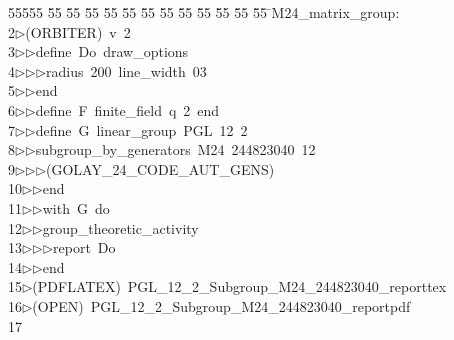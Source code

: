 %
%
\begin{tabbing}
55555 \= 55 \= 55 \= 55 \= 55 \= 55 \= 55 \= 55 \= 55 \= 55 \= 55 \= 55 \= 55 \= \>M24\_matrix\_group:\\[0pt]
2\>$\triangleright$\>(ORBITER)\ v\ 2\ \\[0pt]
3\>$\triangleright$\>$\triangleright$\>define\ Do\ draw\_options\ \\[0pt]
4\>$\triangleright$\>$\triangleright$\>$\triangleright$\>radius\ 200\ line\_width\ 03\ \\[0pt]
5\>$\triangleright$\>$\triangleright$\>end\ \\[0pt]
6\>$\triangleright$\>$\triangleright$\>define\ F\ finite\_field\ q\ 2\ end\ \\[0pt]
7\>$\triangleright$\>$\triangleright$\>define\ G\ linear\_group\ PGL\ 12\ 2\ \\[0pt]
8\>$\triangleright$\>$\triangleright$\>subgroup\_by\_generators\ M24\ 244823040\ 12\ \\[0pt]
9\>$\triangleright$\>$\triangleright$\>$\triangleright$\>(GOLAY\_24\_CODE\_AUT\_GENS)\ \\[0pt]
10\>$\triangleright$\>$\triangleright$\>end\ \\[0pt]
11\>$\triangleright$\>$\triangleright$\>with\ G\ do\ \\[0pt]
12\>$\triangleright$\>$\triangleright$\>group\_theoretic\_activity\ \\[0pt]
13\>$\triangleright$\>$\triangleright$\>$\triangleright$\>report\ Do\ \\[0pt]
14\>$\triangleright$\>$\triangleright$\>end\\[0pt]
15\>$\triangleright$\>(PDFLATEX)\ PGL\_12\_2\_Subgroup\_M24\_244823040\_reporttex\\[0pt]
16\>$\triangleright$\>(OPEN)\ PGL\_12\_2\_Subgroup\_M24\_244823040\_reportpdf\\[0pt]
17\>\end{tabbing}
